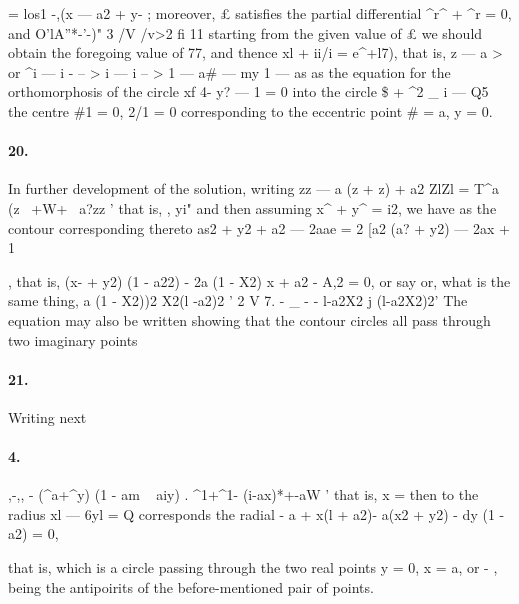 \documentclass[11pt,a4paper]{book}
\begin{document}
{{{{{{{=  los1  \/-,(x  ---  a}2  +  y- ;     moreover,    £    satisfies    the    partial     differential     ^r^  +  ^r    =  0,     and
O'lA''*-'-)"  3  /V  /v>2          fi  11
starting   from   the    given   value   of  £    we    should   obtain    the    foregoing    value   of  77,   and
thence  xl  +  ii/i  =  e^+l7),  that  is,
z  ---  a
>  or  ^i  ---
i  -       --  >  i  ---  i  --  >
1  ---  a\#  ---  my  1  ---  as
as    the    equation    for    the    orthomorphosis    of    the    circle    xf  4-  y?  ---  1  =  0   into   the   circle
\$  +  ^2  \_  i  ---  Q5  the  centre  \#1  =  0,  2/1  =  0  corresponding  to  the  eccentric  point  \#  =  a,  y  =  0.
\paragraph{20.} In  further  development  of  the  solution,  writing
zz  ---  a  (z  +  z)  +  a2
ZlZl  =  T^a  (z  ~+W+  ~a?zz  '
that  is,
,
yi"
and  then  assuming  x^  +  y^  =  i2,  we  have  as  the  contour  corresponding  thereto
as2  +  y2  +  a2  ---  2aae  =  2  [a2  (a?  +  y2)  ---  2ax  +  1  },
that  is,
(x-  +  y2)  (1  -  a22)  -  2a  (1  -  X2)  x  +  a2  -  A,2  =  0,
or  say
or,  what  is  the  same  thing,
a  (1  -  X2))2  X2(l  -a2)2
'  2  V
7.
-         \_  -  -
l-a2X2  j  (l-a2X2)2'
The  equation  may  also  be  written
showing  that  the  contour  circles  all  pass  through  two  imaginary  points
\paragraph{21.} Writing  next
\paragraph{4.} ,-,,  -  (^a+^y)  (1  -  am  ~  aiy) .
^1+^1-  (i-ax)*+-aW  '
that  is,
x  =
then  to  the  radius  xl  ---  6yl  =  Q  corresponds  the  radial
-  a  +  x(l  +  a2)-  a(x2  +  y2)  -  dy  (1  -  a2)  =  0,


that  is,
which  is  a  circle  passing  through  the  two  real  points  y  =  0,  x  =  a,  or  -  ,  being  the
antipoirits  of  the  before-mentioned  pair  of  points.
}}}}}
\end{document}
